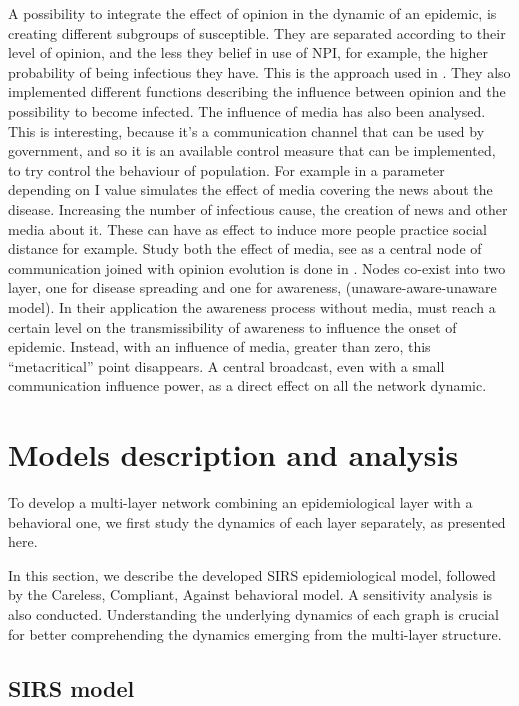 A possibility to integrate the effect of opinion in the dynamic of an epidemic, is creating different subgroups of susceptible. They are separated according to their level of opinion, and the less they belief in use of NPI, for example, the higher probability of being infectious they have. This is the approach used in \cite{Tyson_2020}. They also implemented different functions describing the influence between opinion and the possibility to become infected. 
The influence of media has also been analysed. This is interesting, because it’s a communication channel that can be used by government, and so it is an available control measure that can be implemented, to try control the behaviour of population.  For example in \cite{Collinson2014} a parameter depending on I value simulates the effect of media covering the news about the disease. Increasing the number of infectious cause, the creation of news and other media about it. These can have as effect to induce more people practice social distance for example. Study both the effect of media, see as a central node of communication joined with opinion evolution is done in \cite{Granell_2014}. Nodes co-exist into two layer, one for disease spreading and one for awareness, (unaware-aware-unaware model). In their application the awareness process without media, must reach a certain level on the transmissibility of awareness to influence the onset of epidemic. Instead, with an influence of media, greater than zero, this “metacritical” point disappears. A central broadcast, even with a small communication influence power, as a direct effect on all the network dynamic. 




\chapter{Models description and analysis}
To develop a multi-layer network combining an epidemiological layer with a behavioral one, we first study the dynamics of each layer separately, as presented here. 

In this section, we describe the developed SIRS epidemiological model, followed by the Careless, Compliant, Against behavioral model. A sensitivity analysis is also conducted. Understanding the underlying dynamics of each graph is crucial for better comprehending the dynamics emerging from the multi-layer structure.


\section{SIRS model}
\label{sec:SIRS}

